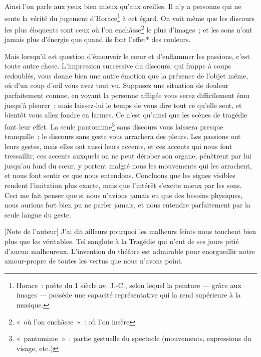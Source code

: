 {Ainsi l'on parle aux yeux bien mieux qu'aux oreilles. Il n'y a personne qui ne sente la vérité du jugement d'Horace\footnote{Horace~: poète du 1\ier{} siècle av. J.-C., selon lequel la peinture --- grâce aux images --- possède une capacité représentative qui la rend supérieure à la musique.} à cet égard. On voit même que les discours les plus éloquents sont ceux où l'on enchâsse\footnote{«~où l'on enchâsse~»~: où l'on insère} le plus d'images~; et les sons n'ont jamais plus d'énergie que quand ils font l'effet* des couleurs.

Mais lorsqu'il est question d'émouvoir le cœur et d'enflammer les passions, c'est toute autre chose. L'impression successive du discours, qui frappe à coups redoublés, vous donne bien une autre émotion que la présence de l'objet même, où d'un coup d'œil vous avez tout vu. Supposez une situation de douleur parfaitement connue, en voyant la personne affligée vous serez difficilement ému jusqu'à pleurer~; mais laissez-lui le temps de vous dire tout ce qu'elle sent, et bientôt vous allez fondre en larmes. Ce n'est qu'ainsi que les scènes de tragédie font leur effet. La seule pantomime\footnote{«~pantomime~»~: partie gestuelle du spectacle (mouvements, expressions du visage, etc.)} sans discours vous laissera presque tranquille~; le discours sans geste vous arrachera des pleurs. Les passions ont leurs gestes, mais elles ont aussi leurs accents, et ces accents qui nous font tressaillir, ces accents auxquels on ne peut dérober son organe, pénètrent par lui jusqu'au fond du cœur, y portent malgré nous les mouvements qui les arrachent, et nous font sentir ce que nous entendons. Concluons que les signes visibles rendent l'imitation plus exacte, mais que l'intérêt s'excite mieux par les sons. Ceci me fait penser que si nous n'avions jamais eu que des besoins physiques, nous aurions fort bien pu ne parler jamais, et nous entendre parfaitement par la seule langue du geste.

{\small *[Note de l'auteur] J'ai dit ailleurs pourquoi les malheurs feints nous touchent bien plus que les véritables. Tel sanglote à la Tragédie qui n'eut de ses jours pitié d'aucun malheureux. L'invention du théâtre est admirable pour enorgueillir notre amour-propre de toutes les vertus que nous n'avons point.}
}

